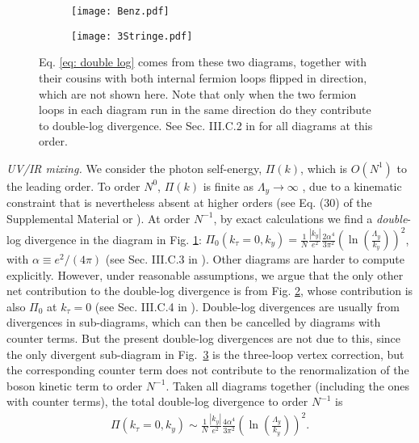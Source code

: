 \documentclass[prl,amsmath,amssymb, notitlepage, twocolumn,
nofootinbib,
superscriptaddress,
longbibliography
]{revtex4-1}
\newcommand{\beq}{\begin{eqnarray}}
\newcommand{\eeq}{\end{eqnarray}}
\begin{document}
\begin{figure}
     \centering
    \begin{subfigure}{\linewidth}
         \texttt{[image: Benz.pdf]}
          \caption{
          }
         \label{FD: Benz}
    \end{subfigure}
    \begin{subfigure}{\linewidth}
         \texttt{[image: 3Stringe.pdf]}
          \caption{
          }\label{FD: 3Stringe}
         
    \end{subfigure}
        \caption{Eq. \eqref{eq: double log} comes from these two diagrams, together with their cousins with both internal fermion loops flipped in direction, which are not shown here. Note that only when the two fermion loops in each diagram run in the same direction do they contribute  to double-log divergence. See Sec. III.C.2 in \cite{supp} for all diagrams at this order.}
\label{FD: double log diagrams}
\end{figure}



{\it UV/IR mixing.} We consider the photon self-energy, $\Pi(k)$, which is $O(N^1)$ to the leading order.
To order $N^0$, $\Pi(k)$ is finite as $\Lambda_y\rightarrow\infty$ \cite{Metlitski2010, Mross2010}, due to a kinematic constraint that is nevertheless absent at higher orders (see Eq. (30) of the Supplemental Material \cite{supp} or \cite{Holder2015b}).
At order $N^{-1}$, by exact calculations we find a {\it double}-log divergence in the diagram in Fig. \ref{FD: Benz}:
$\Pi_0(k_\tau=0, k_y)= \frac{1}{N}\frac{|k_y|}{e^2}\frac{2\alpha^4}{3\pi^2}\left(\ln\left(\frac{\Lambda_y}{k_y}\right)\right)^2$, with $\alpha\equiv e^2/(4\pi)$ (see Sec. III.C.3 in \cite{supp}). Other diagrams are harder to compute explicitly.
However, under reasonable assumptions, we argue that the only other net contribution to the double-log divergence is from Fig. \ref{FD: 3Stringe}, whose contribution is also $\Pi_0$ at $k_\tau=0$ (see Sec. III.C.4 in \cite{supp}). Double-log divergences are usually from divergences in sub-diagrams, which can then be cancelled by  diagrams with counter terms. 
But the present double-log divergences are not due to this, since the only divergent sub-diagram in Fig.~\ref{FD: double log diagrams} 
is the three-loop vertex correction, but the corresponding counter term does not contribute to the renormalization of the boson kinetic term to order $N^{-1}$. Taken all diagrams together (including the ones with counter terms), the total double-log divergence to order $N^{-1}$ is
\beq
\label{eq: double log}
\Pi(k_\tau=0, k_y)\sim \frac{1}{N}\frac{|k_y|}{e^2}\frac{4\alpha^4}{3\pi^2}\left(\ln\left(\frac{\Lambda_y}{k_y}\right)\right)^2.
\eeq
\end{document}
